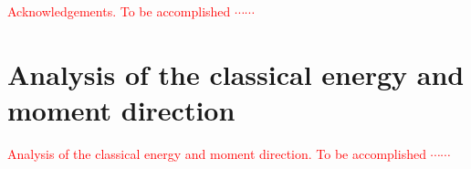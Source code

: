 \documentclass[aps,prb,reprint,amsfonts,amsmath,amssymb,showpacs,groupedaddress,superscriptaddress]{revtex4-1}
\begin{document}
\begin{acknowledgments}
    \textcolor{red}{Acknowledgements.  To be accomplished $\cdots \cdots$}
\end{acknowledgments}


\appendix

\section{Analysis of the classical energy and moment direction}
\textcolor{red}{Analysis of the classical energy and moment direction. To be accomplished $\cdots \cdots$}

\newpage


\end{document}
